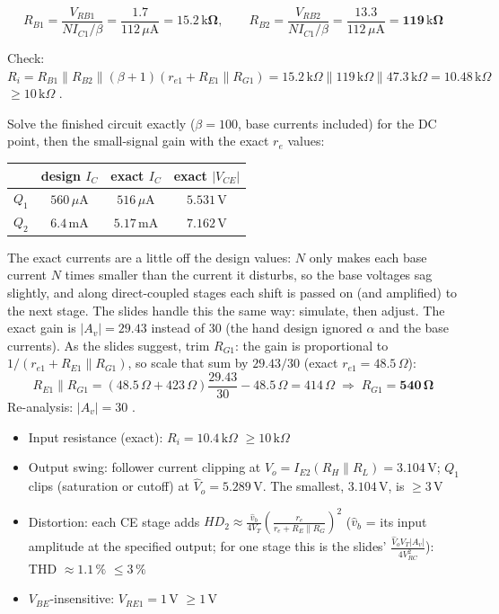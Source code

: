 \documentclass[11pt]{article}
\newcommand{\solstep}[2]{\par\medskip{\color{stepc}\textbf{Step #1 --- #2}}\par\nopagebreak}
\begin{document}
\[R_{B1} = \frac{V_{RB1}}{N I_{C1}/\beta} = \frac{1.7}{112\,\mu \mathrm{A}} = \mathbf{15.2\,\mathrm{k}\Omega},\qquad R_{B2} = \frac{V_{RB2}}{N I_{C1}/\beta} = \frac{13.3}{112\,\mu \mathrm{A}} = \mathbf{119\,\mathrm{k}\Omega}\]

Check: $R_i = R_{B1}\|R_{B2}\|(\beta+1)(r_{e1} + R_{E1}\|R_{G1}) = 15.2\,\mathrm{k}\Omega\|119\,\mathrm{k}\Omega\|47.3\,\mathrm{k}\Omega = 10.48\,\mathrm{k}\Omega$ $\ge 10\,\mathrm{k}\Omega$ \checkmark.
\solstep{4}{Check by analysis}Solve the finished circuit exactly ($\beta=100$, base currents included) for the DC point, then the small-signal gain with the exact $r_e$ values:\begin{center}\renewcommand{\arraystretch}{1.35}
\begin{tabular}{cccc}
\toprule
 & design $I_C$ & exact $I_C$ & exact $|V_{CE}|$ \\
\midrule
$Q_{1}$ & $560\,\mu \mathrm{A}$ & $516\,\mu \mathrm{A}$ & $5.531\,\mathrm{V}$ \\
$Q_{2}$ & $6.4\,\mathrm{m}\mathrm{A}$ & $5.17\,\mathrm{m}\mathrm{A}$ & $7.162\,\mathrm{V}$ \\
\bottomrule
\end{tabular}\end{center}
The exact currents are a little off the design values: $N$ only makes each base current $N$ times smaller than the current it disturbs, so the base voltages sag slightly, and along direct-coupled stages each shift is passed on (and amplified) to the next stage. The slides handle this the same way: simulate, then adjust. The exact gain is $|A_v| = 29.43$ instead of $30$ (the hand design ignored $\alpha$ and the base currents). As the slides suggest, trim $R_{G1}$: the gain is proportional to $1/(r_{e1} + R_{E1}\|R_{G1})$, so scale that sum by $29.43/30$ (exact $r_{e1} = 48.5\,\Omega$):\[R_{E1}\|R_{G1} = (48.5\,\Omega + 423\,\Omega)\frac{29.43}{30} - 48.5\,\Omega = 414\,\Omega \;\Rightarrow\; R_{G1} = \mathbf{540\,\Omega}\]Re-analysis: $|A_v| = 30$ \checkmark. \begin{itemize}[leftmargin=*,itemsep=2pt]
\item Input resistance (exact): $R_i = 10.4\,\mathrm{k}\Omega$ $\ge 10\,\mathrm{k}\Omega$ \checkmark
\item Output swing: follower current clipping at $\hat V_o = I_{E2}(R_H\|R_L) = 3.104\,\mathrm{V}$; $Q_{1}$ clips (saturation or cutoff) at $\hat V_o = 5.289\,\mathrm{V}$. The smallest, $3.104\,\mathrm{V}$, is $\ge 3$\,V \checkmark
\item Distortion: each CE stage adds $HD_2 \approx \frac{\hat v_b}{4V_T}\left(\frac{r_e}{r_e + R_E\|R_G}\right)^2$ ($\hat v_b$ = its input amplitude at the specified output; for one stage this is the slides' $\frac{\hat V_o V_T |A_v|}{4V_{RC}^2}$): THD $\approx 1.1\,\%$ $\le 3\,\%$ \checkmark
\item $V_{BE}$-insensitive: $V_{RE1} = 1$\,V $\ge 1$\,V \checkmark
\end{itemize}
\end{document}
